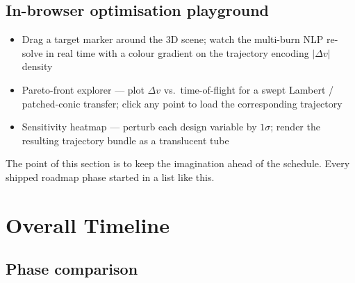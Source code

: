 \documentclass[11pt, a4paper]{article}
\begin{document}
\subsection{In-browser optimisation playground}

\begin{itemize}[leftmargin=*]
  \item Drag a target marker around the 3D scene; watch the multi-burn
        NLP re-solve in real time with a colour gradient on the
        trajectory encoding $|\Delta v|$ density
  \item Pareto-front explorer --- plot $\Delta v$ vs.\ time-of-flight for
        a swept Lambert / patched-conic transfer; click any point to
        load the corresponding trajectory
  \item Sensitivity heatmap --- perturb each design variable by
        $1\sigma$; render the resulting trajectory bundle as a translucent
        tube
\end{itemize}

The point of this section is to keep the imagination ahead of the
schedule. Every shipped roadmap phase started in a list like this.

\newpage
\section{Overall Timeline}

\subsection{Phase comparison}
\end{document}
